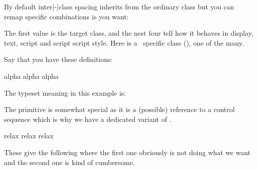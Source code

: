 \startnewprimitive[title={\prm {letmathspacing}}]

By default inter|-|class spacing inherits from the ordinary class but you can
remap specific combinations is you want:

\starttyping
{} \mathfunctioncode
    \mathordinarycode \mathordinarycode
    \mathordinarycode \mathordinarycode
\stoptyping

The first value is the target class, and the nest four tell how it behaves in
display, text, script and script script style. Here \typ {\mathfunctioncode} is a
\CONTEXT\ specific class (\the\mathfunctioncode), one of the many.

\stopnewprimitive

\startnewprimitive[title={\prm {letprotected}}]

Say that you have these definitions:

\startbuffer
             \def  \MyMacroA{alpha}
\protected   {}
             \edef \MyMacroC{\MyMacroA\MyMacroB}
      \MyMacroA
             \edef \MyMacroD{\MyMacroA\MyMacroB}
\meaning           \MyMacroC\crlf
\meaning           \MyMacroD\par
\stopbuffer

\typebuffer

The typeset meaning in this example is:

{\tttf \getbuffer}

\stopnewprimitive

\startnewprimitive[title={\prm {lettolastnamedcs}}]

The  primitive is somewhat special as it is a (possible)
reference to  a control sequence which is why we have a dedicated variant of
.

\startbuffer
\csname relax\endcsname\let                         \foo\lastnamedcs \meaning\foo
\csname relax\endcsname\expandafter\let\expandafter \oof\lastnamedcs \meaning\oof
\csname relax\endcsname{}            \ofo             \meaning\ofo
\stopbuffer

\typebuffer %

These give the following where the first one obviously is not doing what we want
and the second one is kind of cumbersome.

\startlines
\getbuffer
\stoplines

\stopnewprimitive

\startnewprimitive[title={\prm {lettonothing}}]

